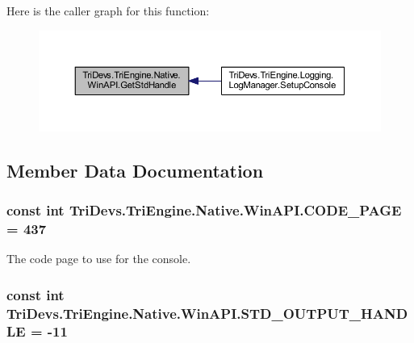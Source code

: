 Here is the caller graph for this function\-:
\nopagebreak
\begin{figure}[H]
\begin{center}
\leavevmode
\includegraphics[width=350pt]{class_tri_devs_1_1_tri_engine_1_1_native_1_1_win_a_p_i_a10f79c8b3a9a2c4c5f7322333912cbed_icgraph}
\end{center}
\end{figure}




\subsection{Member Data Documentation}
\hypertarget{class_tri_devs_1_1_tri_engine_1_1_native_1_1_win_a_p_i_adc3aadbeadf21e00eb044b0f15867203}{
\subsubsection[{C\-O\-D\-E\-\_\-\-P\-A\-G\-E}]{\setlength{\rightskip}{0pt plus 5cm}const int Tri\-Devs.\-Tri\-Engine.\-Native.\-Win\-A\-P\-I.\-C\-O\-D\-E\-\_\-\-P\-A\-G\-E = 437}}\label{class_tri_devs_1_1_tri_engine_1_1_native_1_1_win_a_p_i_adc3aadbeadf21e00eb044b0f15867203}


The code page to use for the console. 

\hypertarget{class_tri_devs_1_1_tri_engine_1_1_native_1_1_win_a_p_i_af25005f0e5e30af231f75210ad4bc09c}{
\subsubsection[{S\-T\-D\-\_\-\-O\-U\-T\-P\-U\-T\-\_\-\-H\-A\-N\-D\-L\-E}]{\setlength{\rightskip}{0pt plus 5cm}const int Tri\-Devs.\-Tri\-Engine.\-Native.\-Win\-A\-P\-I.\-S\-T\-D\-\_\-\-O\-U\-T\-P\-U\-T\-\_\-\-H\-A\-N\-D\-L\-E = -\/11}}\label{class_tri_devs_1_1_tri_engine_1_1_native_1_1_win_a_p_i_af25005f0e5e30af231f75210ad4bc09c}


